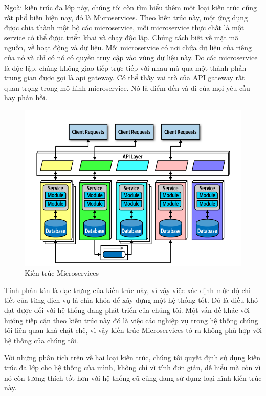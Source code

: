 \par
Ngoài kiến trúc đa lớp này, chúng tôi còn tìm hiểu thêm một loại kiến trúc cũng
rất phổ biến hiện nay, đó là Microservices. Theo kiến trúc này, một ứng dụng
được chia thành một bộ các microservice, mỗi microservice thực chất là một
service có thể được triển khai và chạy độc lập. Chúng tách biệt về mặt mã
nguồn, về hoạt động và dữ liệu. Mỗi microservice có nơi chứa dữ liệu của riêng
của nó và chỉ có nó có quyền truy cập vào vùng dữ liệu này. Do các microservice
là độc lập, chúng không giao tiếp trực tiếp với nhau mà qua một thành phần
trung gian được gọi là \acrshort*{api} gateway. Có thể thấy vai trò của API gateway rất
quan trọng trong mô hình microservice. Nó là điểm đến và đi của mọi yêu cầu hay
phản hồi.
\begin{figure}[H]
      \centering
      \includegraphics[width=\linewidth]{Content/Phân tích và thiết kế hệ thống/documents/Kiến trúc hệ thống/images/microservice.png}
      \vspace{0.5cm}
      \caption{Kiến trúc Microservices}
\end{figure}
\par
Tính phân tán là đặc trưng của kiến trúc này, vì vậy việc xác định mức độ chi
tiết của từng dịch vụ là chìa khóa để xây dựng một hệ thống tốt. Đó là điều khó
đạt được đối với hệ thống đang phát triển của chúng tôi. Một vấn đề khác với
hướng tiếp cận theo kiến trúc này đó là việc các nghiệp vụ trong hệ thống chúng
tôi liên quan khá chặt chẽ, vì vậy kiến trúc Microservices tỏ ra không phù hợp
với hệ thống của chúng tôi.
\par
Với những phân tích trên về hai loại kiến trúc, chúng tôi quyết định sử dụng kiến
trúc đa lớp cho hệ thống của mình, không chỉ vì tính đơn giản, dễ hiểu mà còn vì
nó còn tương thích tốt hơn với hệ thống cũ cũng đang sử dụng loại hình kiến trúc này.